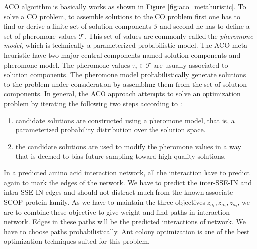 ACO algorithm is basically works as shown in Figure \ref{fig:aco_metahuristic}. To solve a CO problem, to assemble solutions to the CO problem first one has to find or derive a finite set of solution components $\mathcal{S}$ and second he has to define a set of pheromone values $\mathcal{T}$. This set of values are commonly called the \textit{pheromone model}, which is technically a parameterized probabilistic model. The ACO meta-heuristic have two major central components named solution components and pheromone model. The pheromone values ${\tau}_i \in \mathcal{T}$ are usually associated to solution components. The pheromone model probabilistically generate solutions to the problem under consideration by assembling them from the set of solution components. In general, the ACO approach attempts to solve an optimization problem by iterating the following two steps according to \cite{blum2005ant}:
\begin{enumerate}
\item candidate solutions are constructed using a pheromone model, that is, a parameterized probability distribution over the solution space.
\item the candidate solutions are used to modify the pheromone values in a way that is deemed to bias future sampling toward high quality solutions.
\end{enumerate}

In a predicted amino acid interaction network, all the interaction have to predict again to mark the edges of the network. We have to predict the inter-SSE-IN and intra-SSE-IN edges and should not distract much from the known associate SCOP protein family. As we have to maintain the three objectives $z_{o_{1}}, z_{o_{2}}, z_{o_{3}}$, we are to combine these objective to give weight and find paths in interaction network. Edges in these paths will be the predicted interactions of network. We have to choose paths probabilistically. Ant colony optimization is one of the best optimization techniques suited for this problem.
